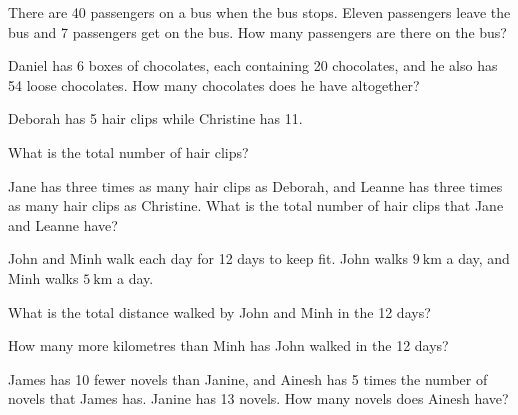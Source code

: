 \begin{exercises}
\begin{questions}
        \Question[2] There are 40 passengers on a bus when the bus stops. Eleven passengers leave the bus and 7 passengers get on the bus. How many passengers are there on the bus?
            \begin{solutionordottedlines}[2in]
            \end{solutionordottedlines}
        \Question[2] Daniel has 6 boxes of chocolates, each containing 20 chocolates, and he also has 54 loose chocolates. How many chocolates does he have altogether?
            \begin{solutionordottedlines}[2in]
            \end{solutionordottedlines}
        \Question[] Deborah has 5 hair clips while Christine has 11.
        \begin{parts}
            \Part[1] What is the total number of hair clips?
            \begin{solutionordottedlines}[1in]
            \end{solutionordottedlines}
            \Part[2] Jane has three times as many hair clips as Deborah, and Leanne has three times as many hair clips as Christine. What is the total number of hair clips that Jane and Leanne have?
            \begin{solutionordottedlines}[1in]
            \end{solutionordottedlines}
        \end{parts}
        \Question[] John and Minh walk each day for 12 days to keep fit. John walks \(9 \mathrm{~km}\) a day, and Minh walks \(5 \mathrm{~km}\) a day.
        \begin{parts}
            \Part[2] What is the total distance walked by John and Minh in the 12 days?
            \begin{solutionordottedlines}[1in]
            \end{solutionordottedlines}
            \Part[2] How many more kilometres than Minh has John walked in the 12 days?
            \begin{solutionordottedlines}[1in]
            \end{solutionordottedlines}
        \end{parts}
        \Question[3] James has 10 fewer novels than Janine, and Ainesh has 5 times the number of novels that James has. Janine has 13 novels. How many novels does Ainesh have?

\end{questions}
\end{exercises}
